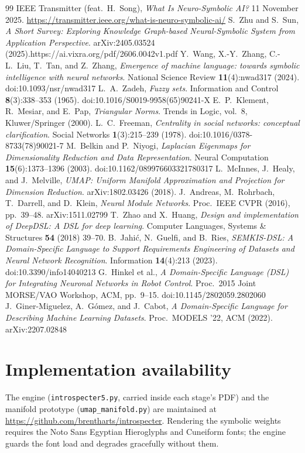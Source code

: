 \documentclass[11pt]{article}
\begin{document}
\begin{thebibliography}{99}
 IEEE Transmitter (feat.\ H.~Song), \emph{What Is Neuro-Symbolic
AI?} 11 November 2025. 
\newline \url{https://transmitter.ieee.org/what-is-neuro-symbolic-ai/}
 S.~Zhu and S.~Sun, \emph{A Short Survey: Exploring Knowledge
Graph-based Neural-Symbolic System from Application Perspective}. arXiv:2405.03524
(2025).https://ai.vixra.org/pdf/2606.0042v1.pdf
 Y.~Wang, X.-Y.~Zhang, C.-L.~Liu, T.~Tan, and Z.~Zhang,
\emph{Emergence of machine language: towards symbolic intelligence with neural
networks}. National Science Review \textbf{11}(4):nwad317 (2024).
doi:10.1093/nsr/nwad317
 L.~A.~Zadeh, \emph{Fuzzy sets}. Information and Control
\textbf{8}(3):338--353 (1965). doi:10.1016/S0019-9958(65)90241-X
 E.~P.~Klement, R.~Mesiar, and E.~Pap, \emph{Triangular Norms}.
Trends in Logic, vol.~8, Kluwer/Springer (2000).
 L.~C.~Freeman, \emph{Centrality in social networks: conceptual
clarification}. Social Networks \textbf{1}(3):215--239 (1978).
doi:10.1016/0378-8733(78)90021-7
 M.~Belkin and P.~Niyogi, \emph{Laplacian Eigenmaps for
Dimensionality Reduction and Data Representation}. Neural Computation
\textbf{15}(6):1373--1396 (2003). doi:10.1162/089976603321780317
 L.~McInnes, J.~Healy, and J.~Melville, \emph{UMAP: Uniform Manifold
Approximation and Projection for Dimension Reduction}. arXiv:1802.03426 (2018).
 J.~Andreas, M.~Rohrbach, T.~Darrell, and D.~Klein, \emph{Neural
Module Networks}. Proc.\ IEEE CVPR (2016), pp.\ 39--48. arXiv:1511.02799
 T.~Zhao and X.~Huang, \emph{Design and implementation of DeepDSL:
A DSL for deep learning}. Computer Languages, Systems \& Structures \textbf{54}
(2018) 39--70.
 B.~Jahi\'c, N.~Guelfi, and B.~Ries, \emph{SEMKIS-DSL: A
Domain-Specific Language to Support Requirements Engineering of Datasets and Neural
Network Recognition}. Information \textbf{14}(4):213 (2023).
doi:10.3390/info14040213
 G.~Hinkel et al., \emph{A Domain-Specific Language (DSL) for
Integrating Neuronal Networks in Robot Control}. Proc.\ 2015 Joint MORSE/VAO
Workshop, ACM, pp.\ 9--15. doi:10.1145/2802059.2802060
 J.~Giner-Miguelez, A.~G\'omez, and J.~Cabot, \emph{A
Domain-Specific Language for Describing Machine Learning Datasets}. Proc.\ MODELS
'22, ACM (2022). arXiv:2207.02848
\end{thebibliography}

\appendix
\section{Implementation availability}
The engine (\texttt{introspecter5.py}, carried inside each stage's PDF) and the
manifold prototype (\texttt{umap\_manifold.py}) are maintained at
\url{https://github.com/brentharts/introspecter}. Rendering the symbolic weights
requires the Noto Sans Egyptian Hieroglyphs and Cuneiform fonts; the engine guards
the font load and degrades gracefully without them.
\end{document}
